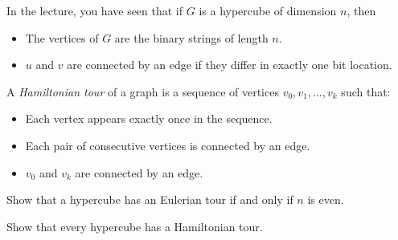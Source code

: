 \documentclass[11pt]{article}
\begin{document}
In the lecture, you have seen that if $G$ is a hypercube of dimension $n$, then
\begin{itemize}
    \item The vertices of $G$ are the binary strings of length $n$.
    \item $u$ and $v$ are connected by an edge if they differ in exactly one bit location.
\end{itemize}

A \emph{Hamiltonian tour} of a graph is a sequence of vertices
$v_0, v_1, \ldots, v_k$ such that:
\begin{itemize}
    \item Each vertex appears exactly once in the sequence.
    \item Each pair of consecutive vertices is connected by an edge.
    \item $v_0$ and $v_k$ are connected by an edge.
\end{itemize}

\begin{Parts}

    \Part Show that a hypercube has an Eulerian tour if and only if $n$ is even.
    

    \Part Show that every hypercube has a Hamiltonian tour. 

    

\end{Parts}
\pagebreak
{}
\end{document}
